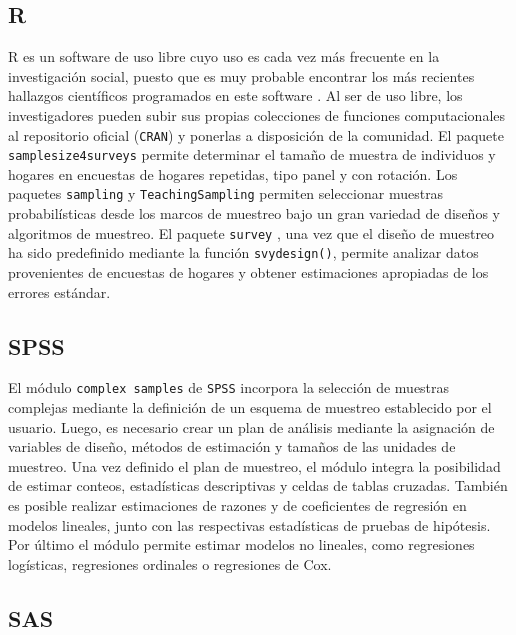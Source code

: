 \documentclass[12pt,spanish,]{book}
\begin{document}
\hypertarget{r}{%
\subsection*{R}\label{r}}

R es un software de uso libre cuyo uso es cada vez más frecuente en la investigación social, puesto que es muy probable encontrar los más recientes hallazgos científicos programados en este software \autocite{R_2017}. Al ser de uso libre, los investigadores pueden subir sus propias colecciones de funciones computacionales al repositorio oficial (\texttt{CRAN}) y ponerlas a disposición de la comunidad. El paquete \texttt{samplesize4surveys} \autocite{ss4s} permite determinar el tamaño de muestra de individuos y hogares en encuestas de hogares repetidas, tipo panel y con rotación. Los paquetes \texttt{sampling} \autocite{Yves} y \texttt{TeachingSampling} \autocite{TS} permiten seleccionar muestras probabilísticas desde los marcos de muestreo bajo un gran variedad de diseños y algoritmos de muestreo. El paquete \texttt{survey} \autocite{TL}, una vez que el diseño de muestreo ha sido predefinido mediante la función \texttt{svydesign()}, permite analizar datos provenientes de encuestas de hogares y obtener estimaciones apropiadas de los errores estándar.

\hypertarget{spss}{%
\subsection*{SPSS}\label{spss}}

El módulo \texttt{complex\ samples} de \texttt{SPSS} \autocite{IBM_2017} incorpora la selección de muestras complejas mediante la definición de un esquema de muestreo establecido por el usuario. Luego, es necesario crear un plan de análisis mediante la asignación de variables de diseño, métodos de estimación y tamaños de las unidades de muestreo. Una vez definido el plan de muestreo, el módulo integra la posibilidad de estimar conteos, estadísticas descriptivas y celdas de tablas cruzadas. También es posible realizar estimaciones de razones y de coeficientes de regresión en modelos lineales, junto con las respectivas estadísticas de pruebas de hipótesis. Por último el módulo permite estimar modelos no lineales, como regresiones logísticas, regresiones ordinales o regresiones de Cox.

\hypertarget{sas}{%
\subsection*{SAS}\label{sas}}
\end{document}
